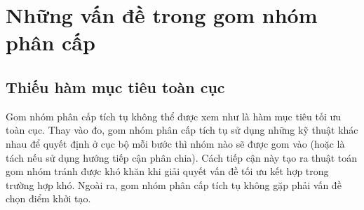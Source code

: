\begin{table}[h!]
\centering
\caption{Hệ số của Lance-William dành cho các cách gom nhóm phân cấp}
\label{tab:2_3}
\end{table}


\section{Những vấn đề trong gom nhóm phân cấp}
\subsection{Thiếu hàm mục tiêu toàn cục}
Gom nhóm phân cấp tích tụ không thể được xem như là hàm mục tiêu tối ưu toàn cục.
Thay vào đo, gom nhóm phân cấp tích tụ sử dụng những kỹ thuật khác nhau để quyết định ở cục bộ mỗi bước thì nhóm nào sẽ được gom vào (hoặc là tách nếu sử dụng hướng tiếp cận phân chia).
Cách tiếp cận này tạo ra thuật toán gom nhóm tránh được khó khăn khi giải quyết vấn đề tối ưu kết hợp trong trường hợp khó.
Ngoài ra, gom nhóm phân cấp tích tụ không gặp phải vấn đề chọn điểm khởi tạo.


